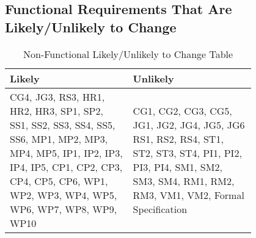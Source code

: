 \documentclass[12pt]{article}
\begin{document}
\subsection{Functional Requirements That Are Likely/Unlikely to Change}
\begin{table}[h]
    \centering
    \begin{tabular}{|p{0.40\linewidth} | p{0.40\linewidth}|}
    \hline
         Likely & Unlikely \\
         \hline
         CG4, JG3, RS3, HR1, HR2, HR3, SP1, SP2, SS1, SS2, SS3, SS4, SS5, SS6, MP1, MP2, MP3, MP4, MP5, IP1, IP2, IP3, IP4, IP5, CP1, CP2, CP3, CP4, CP5, CP6, WP1, WP2, WP3, WP4, WP5, WP6, WP7, WP8, WP9, WP10 & CG1, CG2, CG3, CG5, JG1, JG2, JG4, JG5, JG6 RS1, RS2, RS4, ST1, ST2, ST3, ST4, PI1, PI2, PI3, PI4, SM1, SM2, SM3, SM4, RM1, RM2, RM3, VM1, VM2, Formal Specification   \\
         \hline
    \end{tabular}
    \caption{Non-Functional Likely/Unlikely to Change Table}
    \label{tab:my_label2}
\end{table}
\end{document}
